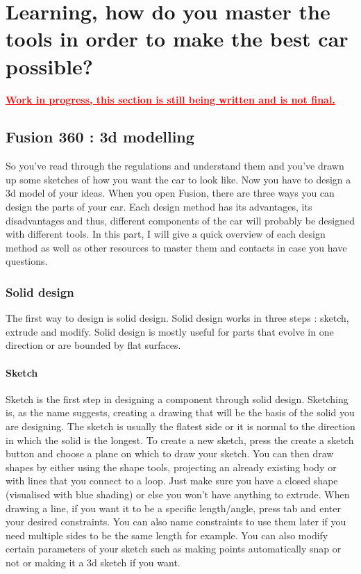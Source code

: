 \chapter{Learning, how do you master the tools in order to make the best car possible?}

\textcolor{red}{\underline{\textbf{Work in progress, this section is still being written and is not final.}}}

\section{Fusion 360 : 3d modelling}

So you’ve read through the regulations and understand them and you’ve drawn up some sketches of how you want the car to look like. Now you have to design a 3d model of your ideas. When you open Fusion, there are three ways you can design the parts of your car. Each design method has its advantages, its disadvantages and thus, different components of the car will probably be designed with different tools. In this part, I will give a quick overview of each design method as well as other resources to master them and contacts in case you have questions.

\subsection{Solid design}
The first way to design is solid design. Solid design works in three steps : sketch, extrude and modify. Solid design is mostly useful for parts that evolve in one direction or are bounded by flat surfaces. 

\subsubsection{Sketch}
Sketch is the first step in designing a component through solid design. Sketching is, as the name suggests, creating a drawing that will be the basis of the solid you are designing. The sketch is usually the flatest side or it is normal to the direction in which the solid is the longest. To create a new sketch, press the create a sketch button and choose a plane on which to draw your sketch. You can then draw shapes by either using the shape tools, projecting an already existing body or with lines that you connect to a loop. Just make sure you have a closed shape (visualised with blue shading) or else you won’t have anything to extrude. When drawing a line, if you want it to be a specific length/angle, press tab and enter your desired constraints. You can also name constraints to use them later if you need multiple sides to be the same length for example. You can also modify certain parameters of your sketch such as making points automatically snap or not or making it a 3d sketch if you want.


